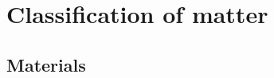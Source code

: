          \chapter{Classification of matter}\label{chap:classification}
    \label{m38708*cid1}
            \section{Materials}
            \nopagebreak

